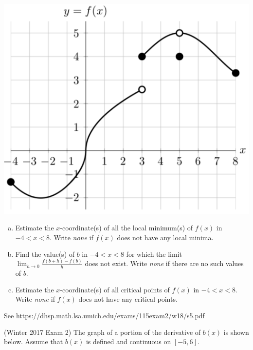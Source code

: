 \documentclass[11pt]{exam}
\begin{document}
\begin{questions}
\begin{itemize}
\end{itemize}
\vspace{-0.5em}
\begin{center}
  \includegraphics[scale=0.4]{Figures/Exam2W2018Problem5}
\end{center}
\begin{enumerate}[(a)]
	\item Estimate the $x$-coordinate(s) of all the local minimum(s) of $f(x)$ in $-4<x<8$. Write \emph{none} if $f(x)$ does not have any local minima.
	\item Find the value(s) of $b$ in $-4<x<8$ for which the limit $\displaystyle\lim_{h \rightarrow 0} \frac{f(b+h)-f(b)}{h}$
does not exist. Write \emph{none} if there are no such values of $b$.
 	\item Estimate the $x$-coordinate(s) of all critical points of $f(x)$ in $-4 < x < 8$. Write \emph{none} if $f(x)$ does not have any critical points.
\end{enumerate}
\begin{solution}
  See \href{https://dhsp.math.lsa.umich.edu/exams/115exam2/w18/s5.pdf}{https://dhsp.math.lsa.umich.edu/exams/115exam2/w18/s5.pdf}
\end{solution}
      \question (Winter 2017 Exam 2) %
        The graph of a portion of the derivative of $b(x)$ is shown below. Assume that $b(x)$ is defined and continuous on $[-5, 6]$.
        \begin{center}

\end{center}
\end{questions}
\end{document}

